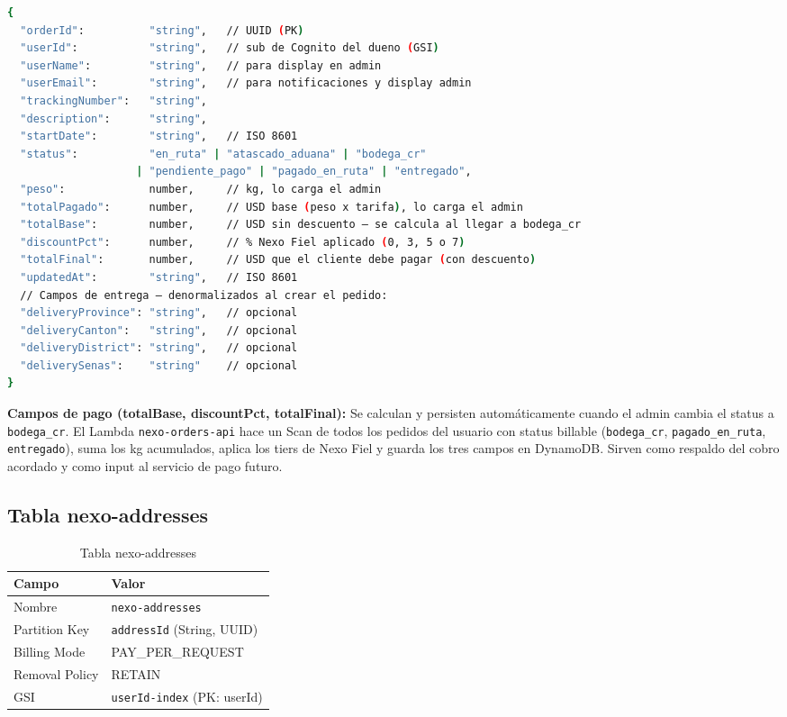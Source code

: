 \documentclass[12pt,a4paper]{article}
\begin{document}
\begin{lstlisting}[language=bash, caption={Esquema de ítem en nexo-orders}]
{
  "orderId":          "string",   // UUID (PK)
  "userId":           "string",   // sub de Cognito del dueno (GSI)
  "userName":         "string",   // para display en admin
  "userEmail":        "string",   // para notificaciones y display admin
  "trackingNumber":   "string",
  "description":      "string",
  "startDate":        "string",   // ISO 8601
  "status":           "en_ruta" | "atascado_aduana" | "bodega_cr"
                    | "pendiente_pago" | "pagado_en_ruta" | "entregado",
  "peso":             number,     // kg, lo carga el admin
  "totalPagado":      number,     // USD base (peso x tarifa), lo carga el admin
  "totalBase":        number,     // USD sin descuento — se calcula al llegar a bodega_cr
  "discountPct":      number,     // % Nexo Fiel aplicado (0, 3, 5 o 7)
  "totalFinal":       number,     // USD que el cliente debe pagar (con descuento)
  "updatedAt":        "string",   // ISO 8601
  // Campos de entrega — denormalizados al crear el pedido:
  "deliveryProvince": "string",   // opcional
  "deliveryCanton":   "string",   // opcional
  "deliveryDistrict": "string",   // opcional
  "deliverySenas":    "string"    // opcional
}
\end{lstlisting}

\begin{nexobox}
\textbf{Campos de pago (totalBase, discountPct, totalFinal):} Se calculan y persisten
automáticamente cuando el admin cambia el status a \texttt{bodega\_cr}. El Lambda
\texttt{nexo-orders-api} hace un Scan de todos los pedidos del usuario con status
billable (\texttt{bodega\_cr}, \texttt{pagado\_en\_ruta}, \texttt{entregado}), suma
los kg acumulados, aplica los tiers de Nexo Fiel y guarda los tres campos en DynamoDB.
Sirven como respaldo del cobro acordado y como input al servicio de pago futuro.
\end{nexobox}

\subsection{Tabla nexo-addresses}

\begin{table}[H]
\centering
\begin{tabular}{@{}ll@{}}
\toprule
\textbf{Campo} & \textbf{Valor} \\
\midrule
Nombre & \texttt{nexo-addresses} \\
Partition Key & \texttt{addressId} (String, UUID) \\
Billing Mode & PAY\_PER\_REQUEST \\
Removal Policy & RETAIN \\
GSI & \texttt{userId-index} (PK: userId) \\
\bottomrule
\end{tabular}
\caption{Tabla nexo-addresses}
\end{table}
\end{document}
